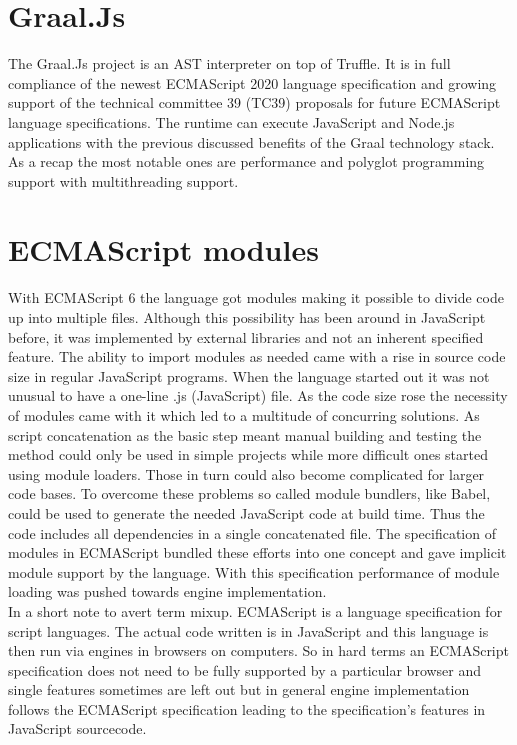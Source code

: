 \section{Graal.Js}
The Graal.Js project is an AST interpreter on top of Truffle. It is in full compliance of the newest ECMAScript 2020 language specification \cite{kangax1, GraaljsComp} and growing support of the technical committee 39 (TC39) proposals for future ECMAScript language specifications. \cite{kangax2, gitTC}  The runtime can execute JavaScript and Node.js applications with the previous discussed benefits of the Graal technology stack. \cite{Graaljs} As a recap the most notable ones are performance and polyglot programming support with multithreading support.

\section{ECMAScript modules}
With ECMAScript 6 the language got modules making it possible to divide code up into multiple files. Although this possibility has been around in JavaScript before, it was implemented by external libraries and not an inherent specified feature. The ability to import modules as needed came with a rise in source code size in regular JavaScript programs. When the language started out it was not unusual to have a one-line .js (JavaScript) file. As the code size rose the necessity of modules came with it which led to a multitude of concurring solutions. As script concatenation as the basic step meant manual building and testing the method could only be used in simple projects while more difficult ones started using module loaders. Those in turn could also become complicated for larger code bases. To overcome these problems so called module bundlers, like Babel, could be used to generate the needed JavaScript code at build time. Thus the code includes all dependencies in a single concatenated file. The specification of modules in ECMAScript bundled these efforts into one concept and gave implicit module support by the language. With this specification performance of module loading was pushed towards engine implementation.\\
In a short note to avert term mixup. ECMAScript is a language specification for script languages. The actual code written is in JavaScript and this language is then run via engines in browsers on computers. So in hard terms an ECMAScript specification does not need to be fully supported by a particular browser and single features sometimes are left out but in general engine implementation follows the ECMAScript specification leading to the specification's features in JavaScript sourcecode.\\

